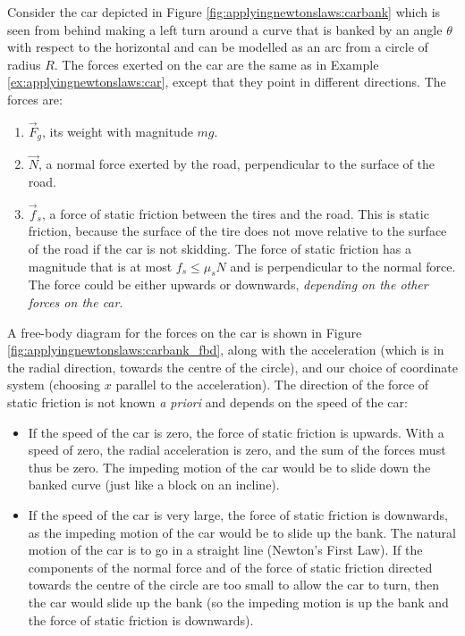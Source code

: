 Consider the car depicted in Figure \ref{fig:applyingnewtonslaws:carbank} which is seen from behind making a left turn around a curve that is banked by an angle $\theta$ with respect to the horizontal and can be modelled as an arc from a circle of radius $R$.
The forces exerted on the car are the same as in Example \ref{ex:applyingnewtonslaws:car}, except that they point in different directions. The forces are:
\begin{enumerate}
\item $\vec F_g$, its weight with magnitude $mg$.
\item $\vec N$, a normal force exerted by the road, perpendicular to the surface of the road.
\item $\vec f_s$, a force of static friction between the tires and the road. This is static friction, because the surface of the tire does not move relative to the surface of the road if the car is not skidding. The force of static friction has a magnitude that is at most $f_s\leq\mu_sN$ and is perpendicular to the normal force. The force could be either upwards or downwards, \textit{depending on the other forces on the car}.
\end{enumerate} 
A free-body diagram for the forces on the car is shown in Figure \ref{fig:applyingnewtonslaws:carbank_fbd}, along with the acceleration (which is in the radial direction, towards the centre of the circle), and our choice of coordinate system (choosing $x$ parallel to the acceleration). The direction of the force of static friction is not known \textit{a priori} and depends on the speed of the car:
\begin{itemize}
\item If the speed of the car is zero, the force of static friction is upwards. With a speed of zero, the radial acceleration is zero, and the sum of the forces must thus be zero. The impeding motion of the car would be to slide down the banked curve (just like a block on an incline).
\item If the speed of the car is very large, the force of static friction is downwards, as the impeding motion of the car would be to slide up the bank. The natural motion of the car is to go in a straight line (Newton's First Law). If the components of the normal force and of the force of static friction directed towards the centre of the circle are too small to allow the car to turn, then the car would slide up the bank (so the impeding motion is up the bank and the force of static friction is downwards).
\end{itemize}
